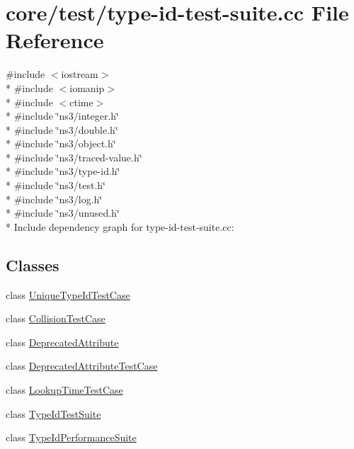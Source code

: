 \hypertarget{type-id-test-suite_8cc}{}\section{core/test/type-\/id-\/test-\/suite.cc File Reference}
\label{type-id-test-suite_8cc}
{\ttfamily \#include $<$iostream$>$}\\*
{\ttfamily \#include $<$iomanip$>$}\\*
{\ttfamily \#include $<$ctime$>$}\\*
{\ttfamily \#include \char`\"{}ns3/integer.\+h\char`\"{}}\\*
{\ttfamily \#include \char`\"{}ns3/double.\+h\char`\"{}}\\*
{\ttfamily \#include \char`\"{}ns3/object.\+h\char`\"{}}\\*
{\ttfamily \#include \char`\"{}ns3/traced-\/value.\+h\char`\"{}}\\*
{\ttfamily \#include \char`\"{}ns3/type-\/id.\+h\char`\"{}}\\*
{\ttfamily \#include \char`\"{}ns3/test.\+h\char`\"{}}\\*
{\ttfamily \#include \char`\"{}ns3/log.\+h\char`\"{}}\\*
{\ttfamily \#include \char`\"{}ns3/unused.\+h\char`\"{}}\\*
Include dependency graph for type-\/id-\/test-\/suite.cc\+:
\subsection*{Classes}
\begin{DoxyCompactItemize}
\item 
class \hyperlink{classUniqueTypeIdTestCase}{Unique\+Type\+Id\+Test\+Case}
\item 
class \hyperlink{classCollisionTestCase}{Collision\+Test\+Case}
\item 
class \hyperlink{classDeprecatedAttribute}{Deprecated\+Attribute}
\item 
class \hyperlink{classDeprecatedAttributeTestCase}{Deprecated\+Attribute\+Test\+Case}
\item 
class \hyperlink{classLookupTimeTestCase}{Lookup\+Time\+Test\+Case}
\item 
class \hyperlink{classTypeIdTestSuite}{Type\+Id\+Test\+Suite}
\item 
class \hyperlink{classTypeIdPerformanceSuite}{Type\+Id\+Performance\+Suite}
\end{DoxyCompactItemize}
